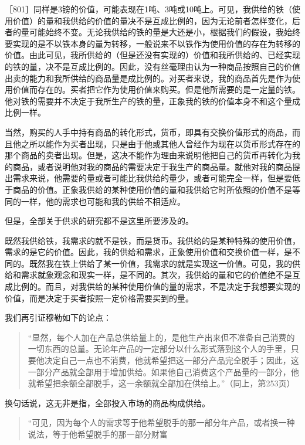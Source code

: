 ［801］同样是3镑的价值，可能表现在1吨、3吨或10吨上。可见，我供给的铁（使用价值）的量和我供给的价值的量决不是互成比例的，因为无论前者怎样变化，后者的量可能始终不变。无论我供给的铁的量是大还是小，根据我们的假设，我始终要实现的是不以铁本身的量为转移，一般说来不以铁作为使用价值的存在为转移的价值。由此可见，我所供给的（但是还没有实现的）价值和我所供给的、已经实现的铁的量，决不是互成比例的。因此，没有丝毫理由认为一种商品按照自己的价值出卖的能力和我所供给的商品量是成比例的。对买者来说，我的商品首先是作为使用价值而存在的。买者把它作为使用价值来购买。但是他所需要的是一定量的铁。他对铁的需要并不决定于我所生产的铁的量，正象我的铁的价值本身不和这个量成比例一样。

当然，购买的人手中持有商品的转化形式，货币，即具有交换价值形式的商品，而且他之所以能作为买者出现，只是由于他或其他人曾经作为现在以货币形式存在的那个商品的卖者出现。但是，这决不能作为理由来说明他把自己的货币再转化为我的商品，或者说明他对我的商品的需要决定于我生产的商品量。就他对我的商品提出需求来说，他需要的量或者可能比我供给的量少，或者可能完全一样，但是要低于商品的价值。正象我供给的某种使用价值的量和我供给它时所依照的价值不是等同的一样，他的需求也可能和我的供给不相适应。

但是，全部关于供求的研究都不是这里所要涉及的。

既然我供给铁，我需求的就不是铁，而是货币。我供给的是某种特殊的使用价值，需求的是它的价值。因此，我的供给和需求，正象使用价值和交换价值一样，是不同的。既然我在铁上供给了某一价值，我需求的就是实现这一价值。可见，我的供给和需求就象观念和现实一样，是不同的。其次，我供给的量和它的价值绝不是互成比例的。而且，对我供给的某种使用价值的量的需求，不是决定于我想要实现的价值，而是决定于买者按照一定价格需要买到的量。

我们再引证穆勒如下的论点：

\begin{quote}{“显然，每个人加在产品总供给量上的，是他生产出来但不准备自己消费的一切东西的总量。无论年产品的一定部分以什么形式落到这个人的手里，只要他决定自己一点也不消费，他就希望把这一部分产品完全脱手；因此，这一部分产品就全部用于增加供给。如果他自己消费这个产品量的一部分，他就希望把余额全部脱手，这一余额就全部加在供给上。”（同上，第253页）}\end{quote}

换句话说，这无非是指，全部投入市场的商品构成供给。

\begin{quote}{“可见，因为每个人的需求等于他希望脱手的那一部分年产品，或者换一种说法，等于他希望脱手的那一部分财富}\end{quote}


